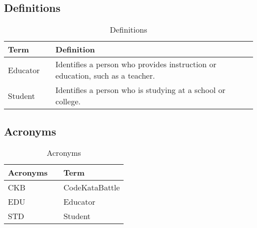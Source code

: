 \subsection{Definitions}
\begin{table}[H]
    \centering
    \renewcommand{\arraystretch}{1.5} 
    \begin{tabular}{l l p{11.5cm}}
    \hline
        \textbf{Term}       & & \textbf{Definition} \\                                                                                                
    \hline
        Educator            & & Identifies a person who provides instruction or education, such as a teacher. \\                                                                                                
        Student             & & Identifies a person who is studying at a school or college. \\ 
    \hline
    \end{tabular}
    \caption{Definitions}
\end{table}

\subsection{Acronyms}
\begin{table}[H]
    \centering
    \renewcommand{\arraystretch}{1.5} 
    \begin{tabular}{l l p{11cm}}
    \hline
        \textbf{Acronyms}   & & \textbf{Term} \\                                                                                                
    \hline
        CKB                 & & CodeKataBattle \\                                                                                                
        EDU                 & & Educator \\ 
        STD                 & & Student \\ 
    \hline
    \end{tabular}
    \caption{Acronyms}
\end{table}

